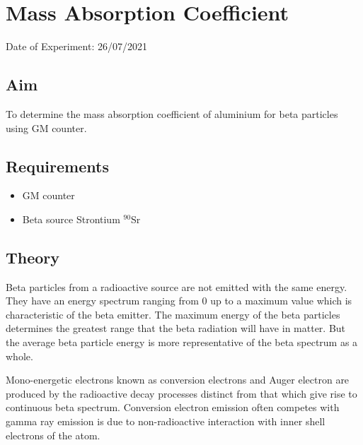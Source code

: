 


	
	\chapter{Mass Absorption Coefficient} %
	\vspace{-1cm}
	
	\begin{center}%
		Date of Experiment: 26/07/2021
	\end{center}
	
	
	\section{Aim}
	To determine the mass absorption coefficient of aluminium for beta particles using GM
	counter.
	
	\section{Requirements}
	\begin{itemize}
		\item 	GM counter
		\item 	Beta source Strontium $ ^{90} $Sr
	\end{itemize}
	
	\section{Theory}
	Beta particles from a radioactive source are not emitted with the same energy. They have an energy spectrum ranging from 0 up to a maximum value which is characteristic of the beta emitter. The maximum energy of the beta particles determines the greatest range that the beta radiation will have in matter. But the average beta particle energy is more representative of the beta spectrum as a whole.
	
	Mono-energetic electrons known as conversion electrons and Auger electron are produced by the radioactive decay processes distinct from that which give rise to continuous beta spectrum. Conversion electron emission often competes with gamma ray emission is due to non-radioactive interaction with inner shell electrons of the atom.
	
